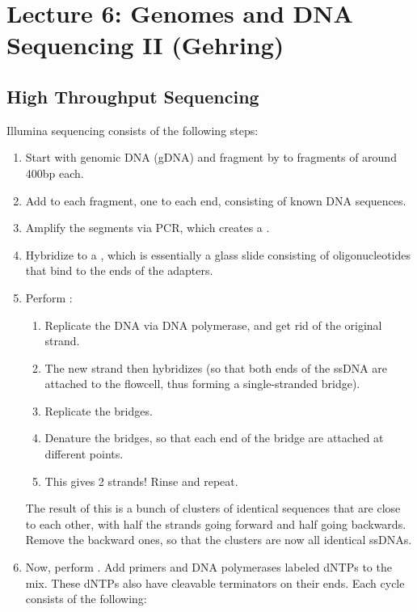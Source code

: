 \section*{Lecture 6: Genomes and DNA Sequencing II (Gehring)}
\setcounter{section}{6}
\setcounter{subsection}{0}
\setcounter{defn}{0}
\setcounter{defncontainer}{0}

\subsection{High Throughput Sequencing}

\begin{exm}
	Illumina sequencing consists of the following steps:
	\begin{enumerate}
		\item Start with genomic DNA (gDNA) and fragment by  to fragments of around 400bp each.
		\item Add  to each fragment, one to each end, consisting of known DNA sequences.
		\item Amplify the segments via PCR, which creates a .
		\item Hybridize to a , which is essentially a glass slide consisting of oligonucleotides that bind to the ends of the adapters.
		\item Perform :
			\begin{enumerate}
				\item Replicate the DNA via DNA polymerase, and get rid of the original strand.
				\item The new strand then hybridizes (so that both ends of the ssDNA are attached to the flowcell, thus forming a single-stranded bridge).
				\item Replicate the bridges.
				\item Denature the bridges, so that each end of the bridge are attached at different points. 
				\item This gives 2 strands! Rinse and repeat.
			\end{enumerate}
			The result of this is a bunch of clusters of identical sequences that are close to each other, with half the strands going forward and half going backwards. Remove the backward ones, so that the clusters are now all identical ssDNAs.
		\item Now, perform . Add primers and DNA polymerases labeled dNTPs to the mix. These dNTPs also have cleavable terminators on their ends. Each cycle consists of the following:

\end{enumerate}
\end{exm}
